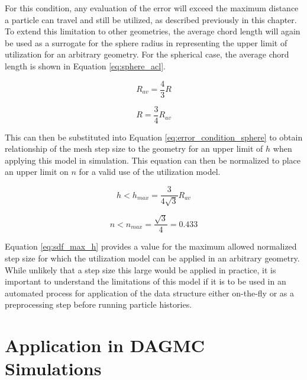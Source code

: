 For this condition, any evaluation of the error will exceed the maximum distance a
particle can travel and still be utilized, as described previously in this
chapter. To extend this limitation to other geometries, the average chord length
will again be used as a surrogate for the sphere radius in representing the upper
limit of utilization for an arbitrary geometry. For the spherical case, the
average chord length is shown in Equation \ref{eq:sphere_acl}.

\begin{equation}
  R_{av} = \frac{4}{3}R
  \label{eq:sphere_acl}
\end{equation}

\begin{equation}
  R = \frac{3}{4} R_{av}
\end{equation}

This can then be substituted into Equation \ref{eq:error_condition_sphere} to obtain
relationship of the mesh step size to the geometry for an upper limit of $h$
when applying this model in simulation. This equation can then be normalized to
place an upper limit on $n$ for a valid use of the utilization model.

\begin{equation}
 h < h_{max} = \frac{3}{4\sqrt{3}} R_{av}
\end{equation}

\begin{equation}
 n < n_{max} = \frac{\sqrt{3}}{4} = 0.433
\label{eq:sdf_max_h}
\end{equation}

Equation \ref{eq:sdf_max_h} provides a value for the maximum allowed normalized step
size for which the utilization model can be applied in an arbitrary
geometry. While unlikely that a step size this large would be applied in
practice, it is important to understand the limitations of this model if it is
to be used in an automated process for application of the data structure either
on-the-fly or as a preprocessing step before running particle histories.

\section{Application in DAGMC Simulations}

